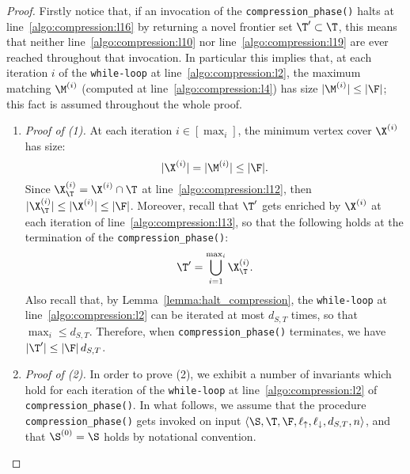 \begin{proof}
Firstly notice that, if an invocation of the \texttt{compression\_phase()}
halts at line~\ref{algo:compression:l16} by returning a novel frontier set $\T'\subset \T$,
this means that neither line~\ref{algo:compression:l10} nor
line~\ref{algo:compression:l19} are ever reached throughout that invocation.
In particular this implies that, at each iteration $i$ of
the \texttt{while-loop} at line~\ref{algo:compression:l2},
the maximum matching $\M^{(i)}$ (computed at line~\ref{algo:compression:l4})
has size $|\M^{(i)}|\leq |\F|$; this fact is assumed throughout the whole proof.

\begin{enumerate}
    \item \emph{Proof of (1).} At each iteration $i\in[\max_i]$, the minimum vertex cover $\X^{(i)}$ has size:
\[|\X^{(i)}|=|\M^{(i)}|\leq |\F|.\]
Since $\X^{(i)}_\T=\X^{(i)}\cap\T$ at line~\ref{algo:compression:l12}, then $|\X^{(i)}_\T| \leq |\X^{(i)}| \leq |\F|$.
Moreover, recall that $\T'$ gets enriched by $\X^{(i)}$ at each iteration of line~\ref{algo:compression:l13},
so that the following holds at the termination of the \texttt{compression\_phase()}:
\[\T'=\bigcup_{i=1}^{\max_i} \X^{(i)}_\T.\] Also recall that, by Lemma~\ref{lemma:halt_compression},
the \texttt{while-loop} at line~\ref{algo:compression:l2} can be iterated at most $d_{S,T}$ times, so that $\max_i\leq d_{S,T}$.
Therefore, when \texttt{compression\_phase()} terminates, we have $|\T'|\leq |\F|\, d_{S,T}$.


\item \emph{Proof of (2).} In order to prove (2),
we exhibit a number of invariants which hold for each iteration of the \texttt{while-loop} at line~\ref{algo:compression:l2} of \texttt{compression\_phase()}.
In what follows, we assume that the procedure \texttt{compression\_phase()} gets invoked on input
$\langle \S,\T,\F,\ell_\uparrow, \ell_\downarrow, d_{S,T}, n \rangle$,
and that $\S^{(0)}=\S$ holds by notational convention.


\end{enumerate}
\end{proof}
